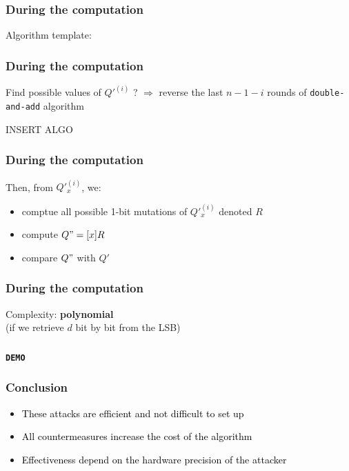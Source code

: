 \documentclass{beamer}
\begin{document}
    \begin{frame}
        \frametitle{During the computation}
        Algorithm template:

    \end{frame}

    \begin{frame}
        \frametitle{During the computation}
        Find possible values of $Q'^{(i)}$ ? $\Rightarrow$ reverse the last $n-1-i$ rounds of {\tt double-and-add} algorithm
        \begin{center}
        INSERT ALGO %
        \end{center}
    \end{frame}

    \begin{frame}
        \frametitle{During the computation}
        Then, from $Q'_x^{(i)}$, we:
        \begin{itemize}
            \item \color{black} { comptue all possible 1-bit mutations of $Q'_x^(i)$ denoted $R$ }
            \item \color{black} { compute $Q" = [x]R$}
            \item \color{black} { compare $Q"$ with $Q'$}
        \end{itemize}
    \end{frame}


    \begin{frame}
        \frametitle{During the computation}
        Complexity: {\bf polynomial}\\

        (if we retrieve $d$ bit by bit from the LSB)

    \end{frame}

    \begin{frame}
        \frametitle{}
        \begin{center}
            {\Huge\bf\tt DEMO}
        \end{center}
    \end{frame}

\begin{frame}
    \frametitle{Conclusion}

    \begin{itemize}
        \item \textcolor{black}{These attacks are efficient and not difficult to set up}
        \item \textcolor{black}{All countermeasures increase the cost of the algorithm}
	\item \textcolor{black}{Effectiveness depend on the hardware precision of the attacker}
    \end{itemize}

\end{frame}
\end{document}
